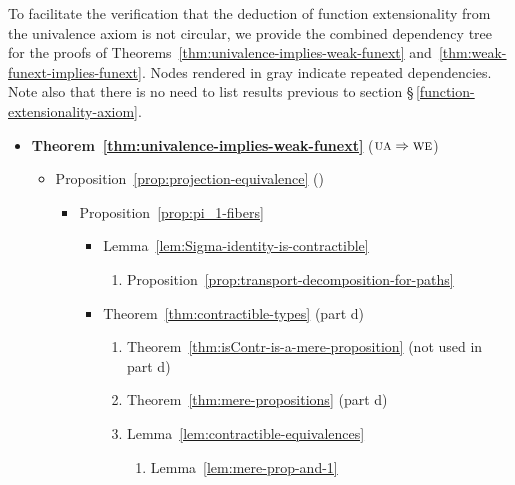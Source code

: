 \begin{rem}\label{rem:dependency-trees}
    To facilitate the verification that the deduction of function extensionality from the univalence axiom is not circular, we provide the combined dependency tree for the proofs of Theorems~\ref{thm:univalence-implies-weak-funext} and~\ref{thm:weak-funext-implies-funext}. Nodes rendered in gray indicate repeated dependencies. Note also that there is no need to list results previous to section \S\,\ref{function-extensionality-axiom}.

{\small
\begin{itemize}[label=$\diamond$]
    \item \textbf{Theorem~\ref{thm:univalence-implies-weak-funext}}
        ($\text{\upshape\textsc{ua}}\Rightarrow\text{\upshape\textsc{we}}$)
    \begin{itemize}[label=$\triangleright$]
        \item Proposition~\ref{prop:projection-equivalence} (\UA)
        \begin{itemize}[label=$\star$]
            \item Proposition~\ref{prop:pi_1-fibers}
            \begin{itemize}[label=$\circ$]
                \item {Lemma~\ref{lem:Sigma-identity-is-contractible}}
                \begin{enumerate}[label=$\scriptstyle\bullet$]
                    \item {Proposition~\ref{prop:transport-decomposition-for-paths}}
                \end{enumerate}
                \item Theorem~\ref{thm:contractible-types} (part d)
                \begin{enumerate}[label=$\scriptstyle\bullet$]
                    \item Theorem~\ref{thm:isContr-is-a-mere-proposition}
                        (not used in part d)
                    \item Theorem~\ref{thm:mere-propositions}
                        (part d)
                    \item {Lemma~\ref{lem:contractible-equivalences}}
                    \begin{enumerate}[label=$\scriptstyle-$]
                        \item{Lemma~\ref{lem:mere-prop-and-1}}

\end{enumerate}
\end{enumerate}
\end{itemize}
\end{itemize}
\end{itemize}
\end{itemize}}
\end{rem}
